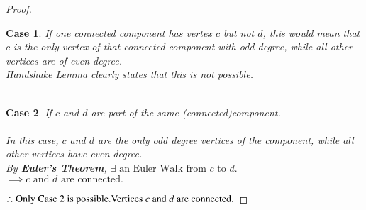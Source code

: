 \documentclass{article}
\newtheorem{case}{Case}
\begin{document}
\begin{proof}
\begin{case}
        If one connected component has vertex $c$ but not $d$, this would mean that $c$ is the only vertex of that connected component with odd degree, while all other vertices are of even degree.\\
        \textit{Handshake Lemma} clearly states that this is not possible.\\
        \\
    \end{case}
    \begin{case}
        If $c$ and $d$ are part of the same (connected)component.\\
        \\
        In this case, $c$ and $d$ are the only odd degree vertices of the component, while all other vertices have even degree.\\
        By \textbf{Euler's Theorem}, $\exists \text{ an Euler Walk from $c$ to $d$.}$
        \\
        $\implies \text{$c$ and $d$ are connected.}$
    \end{case}
    

    $\therefore \text{Only Case 2 is possible.\\ Vertices $c$ and $d$ are connected.}$
\end{proof}
\end{document}
